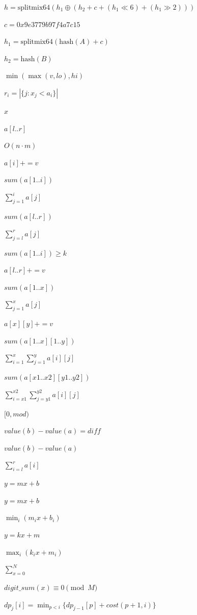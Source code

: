 \documentclass{article}
\begin{document}
$h = \mathrm{splitmix64}(h_1 \oplus (h_2 + c + (h_1 \ll 6) + (h_1 \gg 2)))$
\pagebreak

$c = 0x9e3779b97f4a7c15$
\pagebreak

$h_1 = \mathrm{splitmix64}(\mathrm{hash}(A) + c)$
\pagebreak

$h_2 = \mathrm{hash}(B)$
\pagebreak

$\min(\max(v, lo), hi)$
\pagebreak

$r_i = |\{j : x_j < a_i\}|$
\pagebreak

$x$
\pagebreak

$a[l..r]$
\pagebreak

$O(n \cdot m)$
\pagebreak

$a[i] += v$
\pagebreak

$sum(a[1..i])$
\pagebreak

$\sum_{j=1}^{i} a[j]$
\pagebreak

$sum(a[l..r])$
\pagebreak

$\sum_{j=l}^{r} a[j]$
\pagebreak

$sum(a[1..i]) \ge k$
\pagebreak

$a[l..r] += v$
\pagebreak

$sum(a[1..x])$
\pagebreak

$\sum_{j=1}^{x} a[j]$
\pagebreak

$a[x][y] += v$
\pagebreak

$sum(a[1..x][1..y])$
\pagebreak

$\sum_{i=1}^{x}\sum_{j=1}^{y} a[i][j]$
\pagebreak

$sum(a[x1..x2][y1..y2])$
\pagebreak

$\sum_{i=x1}^{x2}\sum_{j=y1}^{y2} a[i][j]$
\pagebreak

$[0, mod)$
\pagebreak

$value(b) - value(a) = diff$
\pagebreak

$value(b) - value(a)$
\pagebreak

$\sum_{i=l}^{r} a[i]$
\pagebreak

$y = mx + b$
\pagebreak

$y = m x + b$
\pagebreak

$\min_i(m_i x + b_i)$
\pagebreak

$y = k x + m$
\pagebreak

$\max_i(k_i x + m_i)$
\pagebreak

$\sum_{x=0}^{N}$
\pagebreak

$digit\_sum(x) \equiv 0 \pmod M$
\pagebreak

$dp_j[i] = \min_{p < i}\{dp_{j-1}[p] + cost(p+1, i)\}$
\pagebreak
\end{document}

